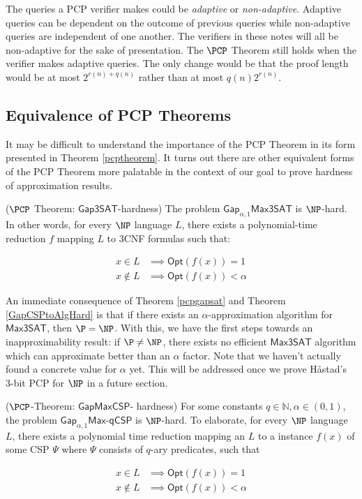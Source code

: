 \begin{remark}
  The queries a PCP verifier makes could be \emph{adaptive} or \emph{non-adaptive}. Adaptive queries can be dependent on the outcome of previous queries while non-adaptive queries are independent of one another. The verifiers in these notes will all be non-adaptive for the sake of presentation. The $\PCP$ Theorem still holds when the verifier makes adaptive queries. The only change would be that the proof length would be at most $2^{r(n) + q(n)}$ rather than at most $q(n)2^{r(n)}$.
\end{remark}


%
\subsection{Equivalence of PCP Theorems}
It may be difficult to understand the importance of the PCP Theorem in its form presented in Theorem \ref{pcptheorem}. It turns out there are other equivalent forms of the PCP Theorem more palatable in the context of our goal to prove hardness of approximation results.

\begin{theorem} \label{pcpgapsat}($\PCP$ Theorem: $\mathsf{Gap3SAT}$-hardness)
The problem $\mathsf{Gap}_{\alpha,1}\mathsf{Max3SAT}$ is $\NP$-hard. In other words, for every $\NP$ language $L$, there exists a polynomial-time reduction $f$ mapping $L$ to 3CNF formulas such that:

\begin{align*}
  x \in L & \implies \mathsf{Opt}(f(x)) = 1 \\
  x \not\in L & \implies \mathsf{Opt}(f(x)) < \alpha
\end{align*}
\end{theorem}

An immediate consequence of Theorem \ref{pcpgapsat} and Theorem \ref{GapCSPtoAlgHard} is that if there exists an $\alpha$-approximation algorithm for $\mathsf{Max3SAT}$, then $\P = \NP$. With this, we have the first steps towards an inapproximability result: if $\P \neq \NP$, there exists no efficient $\mathsf{Max3SAT}$ algorithm which can approximate better than an $\alpha$ factor. Note that we haven't actually found a concrete value for $\alpha$ yet. This will be addressed once we prove H\aa stad's 3-bit PCP for $\NP$ in a future section.


\begin{theorem} ($\PCP$-Theorem: $\mathsf{GapMaxCSP}$- hardness) For some constants $q \in \mathbb{N}, \alpha \in (0,1)$, the problem $\mathsf{Gap}_{\alpha,1}\mathsf{Max}$-$\mathsf{qCSP}$ is $\NP$-hard. To elaborate, for every $\NP$ language $L$, there exists a polynomial time reduction mapping an $L$ to a instance $f(x)$ of some CSP $\Psi$ where $\Psi$ consists of $q$-ary predicates, such that

\begin{align*}
  x \in L & \implies \mathsf{Opt}(f(x)) = 1 \\
  x \not\in L & \implies \mathsf{Opt}(f(x)) < \alpha
\end{align*}
\end{theorem}

